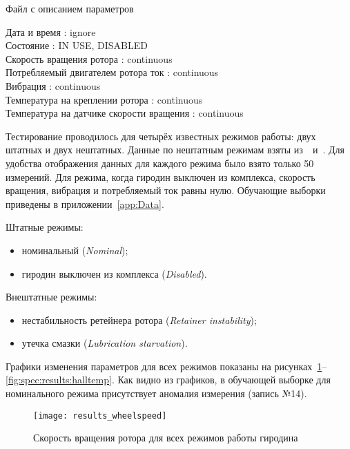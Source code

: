 \begin{algorithm}[h]
\caption{Файл с описанием параметров}
\label{lst:spec:results:params}
\raggedright
\addtolength{\leftskip}{5mm}
\smallskip
Дата и время : ignore \\
Состояние : IN USE, DISABLED \\
Скорость вращения ротора : continuous \\
Потребляемый двигателем ротора ток : continuous \\
Вибрация : continuous \\
Температура на креплении ротора : continuous \\
Температура на датчике скорости вращения : continuous \\
\end{algorithm}

Тестирование проводилось для четырёх известных режимов работы: двух штатных и двух нештатных. Данные по нештатным режимам взяты из~\cite{ISSCMGFailureAnalysis}~и~\cite{ISSCMGLessonsLearned}. Для удобства отображения данных для каждого режима было взято только 50 измерений. Для режима, когда гиродин выключен из комплекса, скорость вращения, вибрация и потребляемый ток равны нулю. Обучающие выборки приведены в приложении~\ref{app:Data}.

Штатные режимы:
\begin{itemize}
	\item номинальный (\textit{Nominal});
	\item гиродин выключен из комплекса (\textit{Disabled}).
\end{itemize}

Внештатные режимы:
\begin{itemize}
	\item нестабильность ретейнера ротора (\textit{Retainer instability});
	\item утечка смазки (\textit{Lubrication starvation}).
\end{itemize}

Графики изменения параметров для всех режимов показаны на рисунках~\ref{fig:spec:results:wheelspeed}--\ref{fig:spec:results:halltemp}. Как видно из графиков, в обучающей выборке для номинального режима присутствует аномалия измерения (запись №14).

\begin{figure}[h]
\texttt{[image: results\_wheelspeed]}
\caption{Скорость вращения ротора для всех режимов работы гиродина}
\label{fig:spec:results:wheelspeed}
\end{figure}

